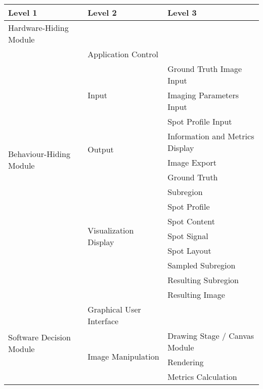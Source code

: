 \begin{tabular}{p{} p{} p{}}
\toprule
\textbf{Level 1} & \textbf{Level 2} & \textbf{Level 3}\\
\midrule

{Hardware-Hiding Module} & ~ \\
\midrule

\multirow{13}{0.3\textwidth}{Behaviour-Hiding Module}
  & Application Control \\
  \cline{2-3}
& \multirow{3}{0.3\textwidth}{Input}
  & Ground Truth Image Input \\
  && Imaging Parameters Input \\
  && Spot Profile Input \\
  \cline{2-3}
& \multirow{2}{0.3\textwidth}{Output}
  & Information and Metrics Display \\
  && Image Export\\
  \cline{2-3}
& \multirow{9}{0.3\textwidth}{Visualization Display}
  & Ground Truth \\
  && Subregion \\
  && Spot Profile \\
  && Spot Content \\
  && Spot Signal \\
  && Spot Layout \\
  && Sampled Subregion \\
  && Resulting Subregion \\
  && Resulting Image \\
\midrule

\multirow{4}{0.3\textwidth}{Software Decision Module}
  & Graphical User Interface \\
  \cline{2-3}
& \multirow{3}{0.3\textwidth}{Image Manipulation}
  & Drawing Stage / Canvas Module \\
  && Rendering \\
  && Metrics Calculation \\
\bottomrule

\end{tabular}